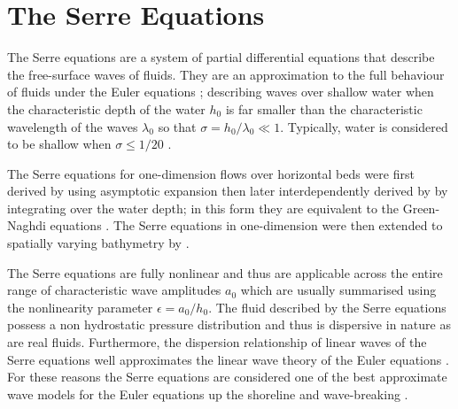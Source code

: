 
\chapter{The Serre Equations}
\label{chp:Serreeqns}










The Serre equations are a system of partial differential equations that describe the free-surface waves of fluids. They are an approximation to the full behaviour of fluids under the Euler equations \cite{Euler-1755-274}; describing waves over shallow water when the characteristic depth of the water $h_0$ is far smaller than the characteristic wavelength of the waves $\lambda_0$ so that $ \sigma = h_0 / \lambda_0  \ll 1 $. Typically, water is considered to be shallow when $\sigma  \le  1/ 20$ \cite{Sorenson-2006}.  

The Serre equations for one-dimension flows over horizontal beds were first derived by \citet{Serre-F-1953-857} using asymptotic expansion then later interdependently derived by \citet{Su-Gardener-1969-536} by integrating over the water depth; in this form they are equivalent to the Green-Naghdi equations \cite{Green-Naghdi-1976-237}. The Serre equations in one-dimension were then extended to spatially varying bathymetry by \citet{Seabra-Santos-etal-1987-117}. 

The Serre equations are fully nonlinear and thus are applicable across the entire range of characteristic wave amplitudes $a_0$ which are usually summarised using the nonlinearity parameter $\epsilon = a_0 / h_0$. The fluid described by the Serre equations possess a non hydrostatic pressure distribution and thus is dispersive in nature as are real fluids. Furthermore, the dispersion relationship of linear waves of the Serre equations well approximates the linear wave theory of the Euler equations \cite{Barthelemy-2004-315}. For these reasons the Serre equations are considered one of the best approximate wave models for the Euler equations up the shoreline and wave-breaking \cite{Bonneton-Lannes-2009-16601,Bonneton-etal-2011-1479}. 

